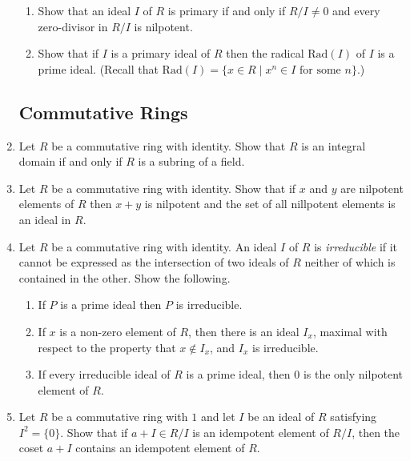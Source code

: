\documentclass{article}
\theoremstyle{definition}
\begin{document}
\begin{enumerate}
            \begin{enumerate}
                \item Show that an ideal $I$ of $R$ is primary if and only if $R/I \neq 0$ and every zero-divisor in $R/I$ is nilpotent.
                \item Show that if $I$ is a primary ideal of $R$ then the radical $\text{Rad}(I)$ of $I$ is a prime ideal. (Recall that $\text{Rad}(I)=\{x\in R\mid x^n\in I \text{ for some } n\}$.)
            \end{enumerate}

        \subsection{Commutative Rings}

            \item Let $R$ be a commutative ring with identity. Show that $R$ is an integral domain if and only if $R$ is a subring of a field. 
            
            \item Let $R$ be a commutative ring with identity. Show that if $x$ and $y$ are nilpotent elements of $R$ then $x+y$ is nilpotent and the set of all nillpotent elements is an ideal in $R$.
            
            \item Let $R$ be a commutative ring with identity. An ideal $I$ of $R$ is \textit{irreducible} if it cannot be expressed as the intersection of two ideals of $R$ neither of which is contained in the other. Show the following. 
            
            \begin{enumerate}
                \item If $P$ is a prime ideal then $P$ is irreducible.
                \item If $x$ is a non-zero element of $R$, then there is an ideal $I_x$, maximal with respect to the property that $x\notin I_x$, and $I_x$ is irreducible.
                \item If every irreducible ideal of $R$ is a prime ideal, then $0$ is the only nilpotent element of $R$.
            \end{enumerate}

            \item Let $R$ be a commutative ring with $1$ and let $I$ be an ideal of $R$ satisfying $I^2=\{0\}$. Show that if $a+I\in R/I$ is an idempotent element of $R/I$, then the coset $a+I$ contains an idempotent element of $R$.
            

\end{enumerate}
\end{document}
